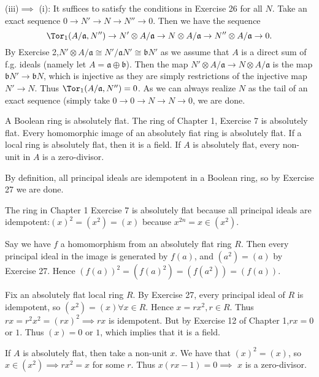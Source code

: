 \documentclass[a4paper]{exam}
\begin{document}
\begin{questions}
\begin{solution}
		(iii)$\implies$ (i):
		It suffices to satisfy the conditions in Exercise 26 for all $N$.
		Take an exact sequence $0\to N' \to N \to N'' \to 0$.
		Then we have the sequence
		\[
			\Tor_1(A / \mathfrak{a},N'') \to N' \otimes A / \mathfrak{a} \to N \otimes A / \mathfrak{a} \to N'' \otimes A / \mathfrak{a}\to 0
		.\]
		By Exercise 2,$N' \otimes A / \mathfrak{a} \cong N' / \mathfrak{a}N' \cong \mathfrak{b}N'$ as we assume that $A$ is a direct sum of f.g. ideals (namely let $A = \mathfrak{a}\oplus \mathfrak{b} $).
		Then the map $N' \otimes A / \mathfrak{a} \to N \otimes A / \mathfrak{a}$ is the map $\mathfrak{b}N' \to \mathfrak{b}N $, which is injective as they are simply restrictions of the injective map $N' \to N$.
		Thus $\Tor_1(A / \mathfrak{a}, N'') = 0$.
		As we can always realize $N$ as the tail of an exact sequence (simply take $0\to 0 \to N \to N \to 0$, we are done.
	\end{solution}

	\question A Boolean ring is absolutely flat. The ring of Chapter 1, Exercise 7 is absolutely flat. Every homomorphic image of an absolutely fiat ring is absolutely flat. If a local ring is absolutely flat, then it is a field. If $A$ is absolutely flat, every non-unit in $A$ is a zero-divisor.
	\begin{solution}
		By definition, all principal ideals are idempotent in a Boolean ring, so by Exercise 27 we are done.

		The ring in Chapter 1 Exercise 7 is absolutely flat because all principal ideals are idempotent:$(x)^2= (x^2) = (x)$ because $x^{2n} = x \in (x^2)$.

		Say we have $f$ a homomorphism from an absolutely flat ring $R$.
		Then every principal ideal in the image is generated by $f(a) $, and $(a^2) = (a)$ by Exercise 27.
		Hence $(f(a))^2 = (f(a)^2) = (f(a^2)) = (f(a))$.

		Fix an absolutely flat local ring $R$.
		By Exercise 27, every principal ideal of $R$ is idempotent, so $(x^2) = (x) \forall x \in R$.
		Hence $x = rx^2, r \in R$.
		Thus $rx = r^2x^2 = (rx)^2 \implies rx$ is idempotent.
		But by Exercise 12 of Chapter 1,$rx = 0$ or $1$.
		Thus $(x) = 0$ or $1 $, which implies that it is a field.

		If $A$ is absolutely flat, then take a non-unit $x$.
		We have that $(x)^2 = (x) $, so $x \in (x^2) \implies rx^2 = x$ for some $r$.
		Thus $x(rx-1) = 0 \implies$ $x$ is a zero-divisor.
	\end{solution}
\end{questions}
\end{document}
